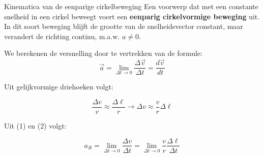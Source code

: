 \begin{theo}{Kinematica van de eenparige cirkelbeweging}
    Een voorwerp dat met een constante snelheid in een cirkel beweegt voert een \textbf{eenparig cirkelvormige beweging} uit. In dit soort beweging blijft de grootte van de snelheidsvector constant, maar verandert de richting continu, m.a.w. $ a \neq 0 $.

    \begin{minipage}{.55\textwidth}

        We berekenen de versnelling door te vertrekken van de formule:
        \begin{equation}
            \Vec{a} = \lim_{\Delta t \to 0} \dfrac{\Delta \Vec{v}}{\Delta t} = \dfrac{d\Vec{v}}{dt}
        \end{equation}
    
        Uit gelijkvormige driehoeken volgt: 
    
        \begin{equation}
            \dfrac{\Delta v}{v} \approx \dfrac{\Delta \ell}{r} \to \Delta v \approx \dfrac{v}{r}\Delta \ell
        \end{equation}

        
        Uit (1) en (2) volgt: 
    
        \begin{equation*}
            a_R = \lim_{\Delta t \to 0} \dfrac{\Delta v}{\Delta t} = \lim_{\Delta t \to 0} \dfrac{v}{r}\dfrac{\Delta \ell}{\Delta t}
        \end{equation*}
    

\end{minipage}
\end{theo}
